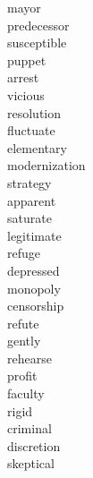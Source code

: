 \documentclass[a4paper, 10pt]{ctexart}
\begin{document}
\begin{multicols*}{2}
\begin{description}
\item[mayor]

\item[predecessor]

\item[susceptible]

\item[puppet]

\item[arrest]

\item[vicious]

\item[resolution]

\item[fluctuate]

\item[elementary]

\item[modernization]

\item[strategy]

\item[apparent]

\item[saturate]

\item[legitimate]

\item[refuge]

\item[depressed]

\item[monopoly]

\item[censorship]

\item[refute]

\item[gently]

\item[rehearse]

\item[profit]

\item[faculty]

\item[rigid]

\item[criminal]

\item[discretion]

\item[skeptical]


\end{description}
\end{multicols*}
\end{document}
